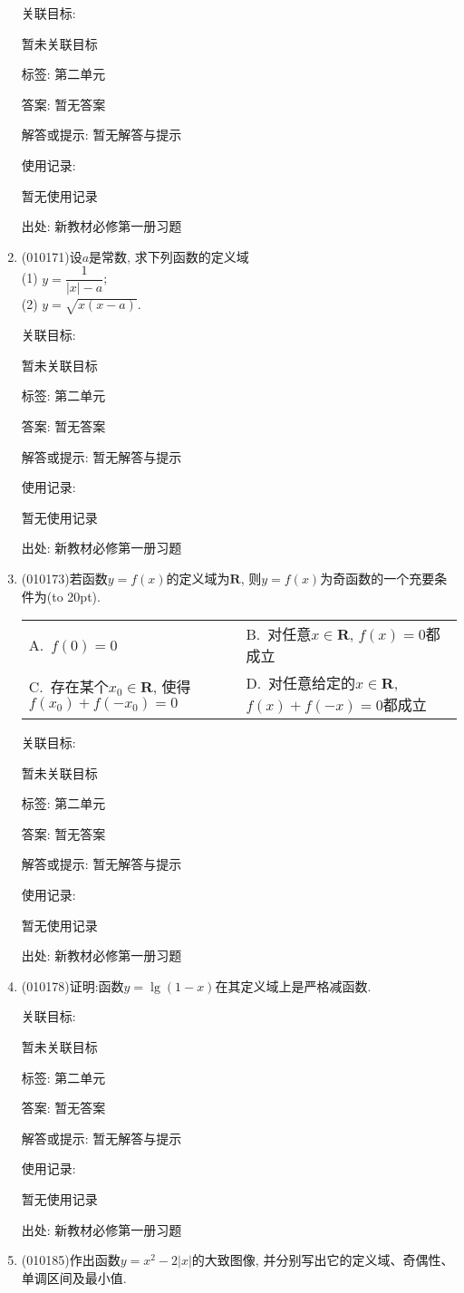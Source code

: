 \documentclass[10pt,a4paper]{article}
\newcommand{\bracket}[1]{(\hbox to #1pt{})}
\newcommand{\twoch}[4]{\par\begin{tabular}{p{.46\textwidth}p{.46\textwidth}}
A.~#1& B.~#2\\
C.~#3& D.~#4
\end{tabular}}
\begin{document}
\begin{enumerate}[1.]
关联目标:

暂未关联目标



标签: 第二单元

答案: 暂无答案

解答或提示: 暂无解答与提示

使用记录:

暂无使用记录


出处: 新教材必修第一册习题
\item { (010171)}设$a$是常数, 求下列函数的定义域\\
(1) $y=\dfrac1{|x|-a}$;\\
(2) $y=\sqrt{x(x-a)}$.


关联目标:

暂未关联目标



标签: 第二单元

答案: 暂无答案

解答或提示: 暂无解答与提示

使用记录:

暂无使用记录


出处: 新教材必修第一册习题
\item { (010173)}若函数$y=f(x)$的定义域为$\mathbf{R}$, 则$y=f(x)$为奇函数的一个充要条件为\bracket{20}.
\twoch{$f(0)=0$}{对任意$x\in \mathbf{R}$, $f(x)=0$都成立}{存在某个$x_0\in \mathbf{R}$, 使得$f(x_0)+f(-x_0)=0$}{对任意给定的$x\in \mathbf{R}$, $f(x)+f(-x)=0$都成立}


关联目标:

暂未关联目标



标签: 第二单元

答案: 暂无答案

解答或提示: 暂无解答与提示

使用记录:

暂无使用记录


出处: 新教材必修第一册习题
\item { (010178)}证明:函数$y=\lg (1-x)$在其定义域上是严格减函数.


关联目标:

暂未关联目标



标签: 第二单元

答案: 暂无答案

解答或提示: 暂无解答与提示

使用记录:

暂无使用记录


出处: 新教材必修第一册习题
\item { (010185)}作出函数$y=x^2-2|x|$的大致图像, 并分别写出它的定义域、奇偶性、单调区间及最小值.



\end{enumerate}
\end{document}
